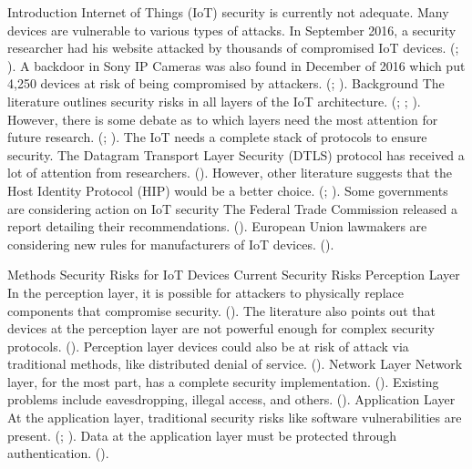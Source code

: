 \documentclass{article}
\begin{document}
\begin{outline}[enumerate]
\1 Introduction
	\2 Internet of Things (IoT) security is currently not adequate.
		\3 Many devices are vulnerable to various types of attacks.
		\3 In September 2016, a security researcher had his website attacked by thousands of compromised IoT devices. (\cite{Krebs}; \cite{Incapsula}).
		\3 A backdoor in Sony IP Cameras was also found in December of 2016 which put 4,250 devices at risk of being compromised by attackers. (\cite{sec}; \cite{Krebs2}).
	\2 Background
		\3 The literature outlines security risks in all layers of the IoT architecture. (\cite{Xiaohui6643029}; \cite{Zhao6746513}; \cite{Suo6188257}).
			\4 However, there is some debate as to which layers need the most attention for future research. (\cite{Zhao6746513}; \cite{Kozlov}).
		\3 The IoT needs a complete stack of protocols to ensure security. 
			\4 The Datagram Transport Layer Security (DTLS) protocol has received a lot of attention from researchers. (\cite{Garcia-Morchon:2013:SII:2462096.2462117}).
			\4 However, other literature suggests that the Host Identity Protocol (HIP) would be a better choice. (\cite{Garcia-Morchon:2013:SII:2462096.2462117}; \cite{Hummen}).
		\3 Some governments are considering action on IoT security
			\4 The Federal Trade Commission released a report detailing their recommendations. (\cite{ftc}).
			\4 European Union lawmakers are considering new rules for manufacturers of IoT devices. (\cite{Stupp}).
			
\1 Methods
\1 Security Risks for IoT Devices
	\2 Current Security Risks
		\3 Perception Layer
			\4 In the perception layer, it is possible for attackers to physically replace components that compromise security. (\cite{Xiaohui6643029}).
			\4 The literature also points out that devices at the perception layer are not powerful enough for complex security protocols. (\cite{Xiaohui6643029}).
			\4 Perception layer devices could also be at risk of attack via traditional methods, like distributed denial of service. (\cite{Zhao6746513}).
		\3 Network Layer
			\4 Network layer, for the most part, has a complete security implementation. (\cite{Zhao6746513}).
			\4 Existing problems include eavesdropping, illegal access, and others. (\cite{Zhao6746513}).
		\3 Application Layer
			\4 At the application layer, traditional security risks like software vulnerabilities are present. (\cite{Xiaohui6643029}; \cite{Zhao6746513}).
			\4 Data at the application layer must be protected through authentication. (\cite{Zhao6746513}).
			

\end{outline}
\end{document}
